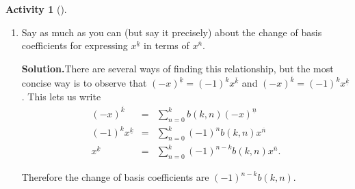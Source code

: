 \documentclass[10pt,]{book}
\theoremstyle{plain}
\theoremstyle{definition}
\newtheorem{activity}[project]{Activity}
\numberwithin{equation}{chapter}
\newcommand{\amp}{&}
\begin{document}
\begin{activity}[]
\begin{enumerate}[label=(\alph*)]
~\par
\item Say as much as you can (but say it precisely) about the change of basis coefficients for expressing \(x^{\underline{k}}\) in terms of \(x^{\overline{n}}\).%
\par\medskip\noindent%
\textbf{Solution.}\quad There are several ways of finding this relationship, but the most concise way is to observe that \((-x)^{\underline{k}}=(-1)^kx^{\overline{k}}\) and \((-x)^{\overline{k}}= (-1)^k x^{\underline{k}}\). This lets us write%
\begin{align*}
(-x)^{\overline{k}}\amp =\amp \sum_{n=0}^k
b(k,n)(-x)^{\underline{n}}\\
(-1)^kx^{\underline{k}}\amp =\amp \sum_{n=0}^k(-1)^nb(k,n)x^{\overline{n}}\\
x^{\underline{k}}\amp =\amp \sum_{n=0}^k (-1)^{n-k}b(k,n)x^{\overline{n}}.
\end{align*}
%
\par
Therefore the change of basis coefficients are \((-1)^{n-k}b(k,n)\).%

\end{enumerate}
\end{activity}
\typeout{************************************************}
\typeout{************************************************}
\end{document}
